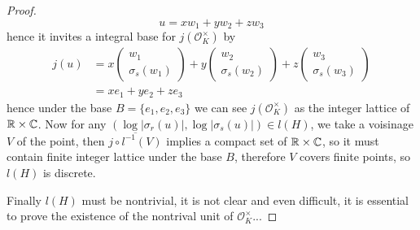 \begin{theorem}
\begin{proof}
         \[u = xw_1+yw_2+zw_3\] hence it invites a integral base for \(j({\mathcal{O}_K^\times})\) by
         \begin{align*}
            j(u) &= x \begin{pmatrix}
                w_1 \\
                \sigma_s(w_1)
             \end{pmatrix}+y\begin{pmatrix}
                w_2 \\
                \sigma_s(w_2)
             \end{pmatrix}+z\begin{pmatrix}
                w_3 \\
                \sigma_s(w_3)
             \end{pmatrix} \\
             &= xe_1+ye_2+ze_3
         \end{align*}
        hence under the base \(B=\{e_1,e_2,e_3\}\) we can see \(j({\mathcal{O}_K^\times})\) as the integer lattice of \(\mathbb{R} \times \mathbb{C}\). Now for any \((\log|\sigma_r(u)|,\log|\sigma_s(u)|) \in l(H)\), we take a voisinage \(V\) of the point, then \(\overline{j\circ l^{-1}(V)}\) implies a compact set of \(\mathbb{R} \times \mathbb{C}\), so it must contain finite integer lattice under the base \(B\), therefore \(V\) covers finite points, so \(l(H)\) is discrete.

        Finally \(l(H)\) must be nontrivial, it is not clear and even difficult, it is essential to prove the existence of the nontrival unit of \(\mathcal{O}_K^{\times}\)...
    \end{proof}
\end{theorem}

